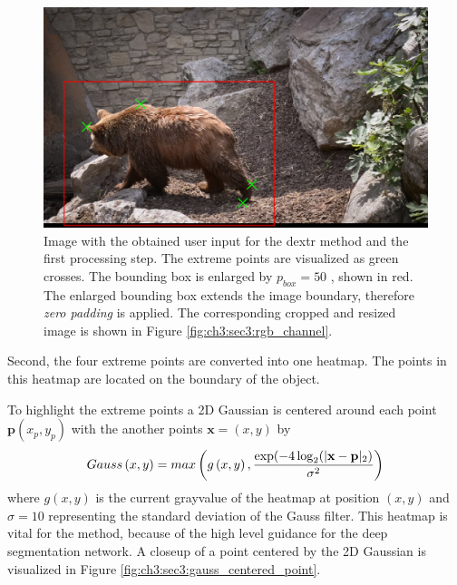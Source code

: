 \begin{figure}
	\includegraphics[width=\linewidth]{figures/chap33_bear_bbox.png}
	\caption[DEXTR User Interaction]{		
		Image with the obtained user input for the \gls{dextr} method and the first processing step.
		The extreme points are visualized as green crosses.
		The bounding box is enlarged by $p_{{box}} = 50$ , shown in red.
		The enlarged bounding box extends the image boundary, therefore \textit{zero padding} is applied.
		The corresponding cropped and resized image is shown in Figure \ref{fig:ch3:sec3:rgb_channel}.
	}
	\label{fig:ch3:sec3:user_interaction}
\end{figure}


Second, the four extreme points are converted into one heatmap.
The points in this heatmap are located on the boundary of the object.

To highlight the extreme points a 2D Gaussian is centered around each point $ \textbf{p} (x_p, y_p) $ with the another points $ \mathbf{x} = (x, y) $ by
\begin{equation} \label{equ:gauss}
	\centering
	Gauss \left( x,y \right)  = max \left( g\left( x,y\right) , \frac{\exp(- 4 \log_{2}(| \textbf{x} - \textbf{p} |_2)}{\sigma^{2}}\right) 
\end{equation}
where $ g (x,y) $ is the current grayvalue of the heatmap at position $ (x, y) $ and $ \sigma = 10 $ representing the standard deviation of the Gauss filter.
This heatmap is vital for the method, because of the high level guidance for the deep segmentation network.
A closeup of a point centered by the 2D Gaussian is visualized in Figure \ref{fig:ch3:sec3:gauss_centered_point}.

